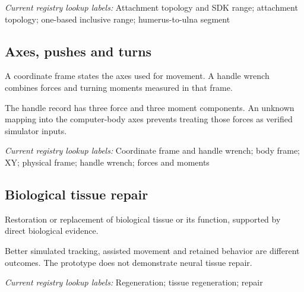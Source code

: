 \noindent\textit{Current registry lookup labels:} Attachment topology and SDK range; attachment topology; one-based inclusive range; humerus-to-ulna segment\par

\begin{samepage}
\subsection*{Axes, pushes and turns}
\noindent A coordinate frame states the axes used for movement. A handle wrench combines forces and turning moments measured in that frame.\par
\end{samepage}
\begin{samepage}
\noindent The handle record has three force and three moment components. An unknown mapping into the computer-body axes prevents treating those forces as verified simulator inputs.\par\nopagebreak[4]

\end{samepage}


\noindent\textit{Current registry lookup labels:} Coordinate frame and handle wrench; body frame; XY; physical frame; handle wrench; forces and moments\par

\begin{samepage}
\subsection*{Biological tissue repair}
\noindent Restoration or replacement of biological tissue or its function, supported by direct biological evidence.\par
\end{samepage}
\begin{samepage}
\noindent Better simulated tracking, assisted movement and retained behavior are different outcomes. The prototype does not demonstrate neural tissue repair.\par\nopagebreak[4]

\end{samepage}


\noindent\textit{Current registry lookup labels:} Regeneration; tissue regeneration; repair\par

